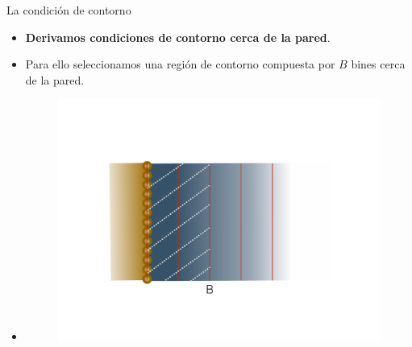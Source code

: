 \documentclass{beamer}
\begin{document}
\begin{frame}{La condición de contorno}
  \begin{itemize}
    \item \textbf{Derivamos condiciones de contorno cerca de la pared}. 
    \item Para ello seleccionamos una \alert{región de contorno} compuesta por $B$ bines cerca de la pared.
\item[]
  \begin{figure}
    \includegraphics[width=\linewidth]{region_contorno}
  \end{figure}
  \end{itemize}
\end{frame}
\end{document}
